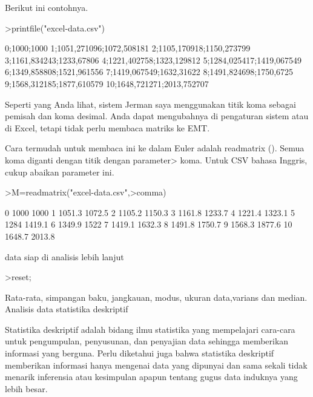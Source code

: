 \documentclass[a4paper,10pt]{article}
\begin{document}
\begin{eulernotebook}
\begin{eulercomment}
\begin{eulercomment}
\begin{eulercomment}
\begin{eulercomment}
\begin{eulercomment}
\begin{eulercomment}
\begin{eulercomment}
\begin{eulercomment}
\begin{eulercomment}
\begin{eulercomment}
\begin{eulercomment}
Berikut ini contohnya.
\end{eulercomment}
\begin{eulerprompt}
>printfile("excel-data.csv")
\end{eulerprompt}
\begin{euleroutput}
  0;1000;1000
  1;1051,271096;1072,508181
  2;1105,170918;1150,273799
  3;1161,834243;1233,67806
  4;1221,402758;1323,129812
  5;1284,025417;1419,067549
  6;1349,858808;1521,961556
  7;1419,067549;1632,31622
  8;1491,824698;1750,6725
  9;1568,312185;1877,610579
  10;1648,721271;2013,752707
\end{euleroutput}
\begin{eulercomment}
Seperti yang Anda lihat, sistem Jerman saya menggunakan titik koma
sebagai pemisah dan koma desimal. Anda dapat mengubahnya di pengaturan
sistem atau di Excel, tetapi tidak perlu membaca matriks ke EMT.

Cara termudah untuk membaca ini ke dalam Euler adalah readmatrix ().
Semua koma diganti dengan titik dengan parameter\textgreater{} koma. Untuk CSV
bahasa Inggris, cukup abaikan parameter ini.
\end{eulercomment}
\begin{eulerprompt}
>M=readmatrix("excel-data.csv",>comma)
\end{eulerprompt}
\begin{euleroutput}
          0      1000      1000 
          1    1051.3    1072.5 
          2    1105.2    1150.3 
          3    1161.8    1233.7 
          4    1221.4    1323.1 
          5      1284    1419.1 
          6    1349.9      1522 
          7    1419.1    1632.3 
          8    1491.8    1750.7 
          9    1568.3    1877.6 
         10    1648.7    2013.8 
\end{euleroutput}
\begin{eulercomment}
data siap di analisis lebih lanjut
\end{eulercomment}
\begin{eulerprompt}
>reset;
\end{eulerprompt}
\begin{eulercomment}
Rata-rata, simpangan baku, jangkauan, modus, ukuran data,varians dan
median.\\
Analisis data statistika deskriptif

Statistika deskriptif adalah bidang ilmu statistika yang mempelajari
cara-cara untuk pengumpulan, penyusunan, dan penyajian data sehingga
memberikan informasi yang berguna. Perlu diketahui juga bahwa
statistika deskriptif memberikan informasi hanya mengenai data yang
dipunyai dan sama sekali tidak menarik inferensia atau kesimpulan
apapun tentang gugus data induknya yang lebih besar.


\end{eulercomment}
\end{eulercomment}
\end{eulercomment}
\end{eulercomment}
\end{eulercomment}
\end{eulercomment}
\end{eulercomment}
\end{eulercomment}
\end{eulercomment}
\end{eulercomment}
\end{eulercomment}
\end{eulernotebook}
\end{document}
